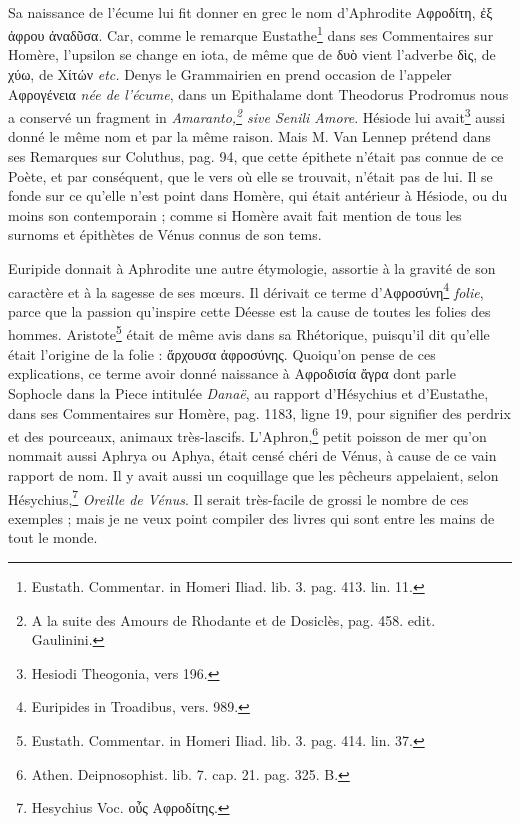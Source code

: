 \documentclass[a4paper, 18pt, oneside]{article}
\begin{document}
\paragraph{}
Sa naissance de l'écume lui fit donner en grec le nom d'Aphrodite Αφροδίτη, ἐξ ἀφρου ἀναδῦσα. Car, comme le remarque Eustathe\footnote{Eustath. Commentar. in Homeri Iliad. lib. 3. pag. 413. lin. 11.} dans ses Commentaires sur Homère, l'upsilon se change en iota, de même que de δυὸ vient l'adverbe δὶς, de χύω, de Χίτών \emph{etc.} Denys le Grammairien en prend occasion de l'appeler Αφρογένεια \emph{née de l'écume}, dans un Epithalame dont Theodorus Prodromus nous a conservé un fragment in \emph{Amaranto,\footnote{A la suite des Amours de Rhodante et de Dosiclès, pag. 458. edit. Gaulinini.} sive Senili Amore}. Hésiode lui avait\footnote{Hesiodi Theogonia, vers 196.} aussi donné le même nom et par la même raison. Mais M. Van Lennep prétend dans ses Remarques sur Coluthus, pag. 94, que cette épithete n'était pas connue de ce Poète, et par conséquent, que le vers où elle se trouvait, n'était pas de lui. Il se fonde sur ce qu'elle n'est point dans Homère, qui était antérieur à Hésiode, ou du moins son contemporain ; comme si Homère avait fait mention de tous les surnoms et épithètes de Vénus connus de son tems.

Euripide donnait à Aphrodite une autre étymologie, assortie à la gravité de son caractère et à la sagesse de ses mœurs. Il dérivait ce terme d'Αφροσύνη\footnote{Euripides in Troadibus, vers. 989.} \emph{folie}, parce que la passion qu'inspire cette Déesse est la cause de toutes les folies des hommes. Aristote\footnote{Eustath. Commentar. in Homeri Iliad. lib. 3. pag. 414. lin. 37.} était de même avis dans sa Rhétorique, puisqu'il dit qu'elle était l'origine de la folie : ἄρχουσα ἀφροσύνης. Quoiqu'on pense de ces explications, ce terme avoir donné naissance à Αφροδισία ἄγρα dont parle Sophocle dans la Piece intitulée \emph{Danaë}, au rapport d'Hésychius et d'Eustathe, dans ses Commentaires sur Homère, pag. 1183, ligne 19, pour signifier des perdrix et des pourceaux, animaux très-lascifs. L'Aphron,\footnote{Athen. Deipnosophist. lib. 7. cap. 21. pag. 325. B.} petit poisson de mer qu'on nommait aussi Aphrya ou Aphya, était censé chéri de Vénus, à cause de ce vain rapport de nom. Il y avait aussi un coquillage que les pêcheurs appelaient, selon Hésychius,\footnote{Hesychius Voc. οὖς Αφροδίτης.} \emph{Oreille de Vénus}. Il serait très-facile de grossi le nombre de ces exemples ; mais je ne veux point compiler des livres qui sont entre les mains de tout le monde.
\end{document}
